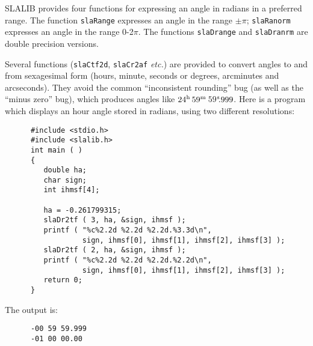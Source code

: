 \documentclass[11pt,fleqn,twoside]{article}
\renewcommand{\_}{{\tt\char'137}}     %
\newcommand{\tseci}[1]   {$#1$\mbox{$^{\rm s}$}}
\newcommand{\tsec}[2]    {\tseci{#1}$\hspace{-0.3em}.#2$}
\newcommand{\hms}[4]    {$#1^{\rm h}\,#2^{\rm m}\,$\tsec{#3}{#4}}
\begin{document}
SLALIB provides four functions for expressing an angle in radians
in a preferred range.  The function
{\tt slaRange}
expresses an angle
in the range $\pm\pi$;
{\tt slaRanorm}
expresses an angle in the range
0-2$\pi$.  The functions
{\tt slaDrange}
and
{\tt slaDranrm}
are double precision versions.

Several functions
({\tt slaCtf2d},
{\tt slaCr2af}
{\it etc.}) are provided to convert
angles to and from
sexagesimal form (hours, minute, seconds or degrees,
arcminutes and arcseconds).
They avoid the common
``inconsistent rounding''
bug (as well as the ``minus zero'' bug),
which produces angles like \hms{24}{59}{59}{999}.
Here is a program which displays an hour angle
stored in radians, using two different resolutions:
\goodbreak
\vspace{-3ex}
\begin{verbatim}
      #include <stdio.h>
      #include <slalib.h>
      int main ( )
      {
         double ha;
         char sign;
         int ihmsf[4];

         ha = -0.261799315;
         slaDr2tf ( 3, ha, &sign, ihmsf );
         printf ( "%c%2.2d %2.2d %2.2d.%3.3d\n",
                  sign, ihmsf[0], ihmsf[1], ihmsf[2], ihmsf[3] );
         slaDr2tf ( 2, ha, &sign, ihmsf );
         printf ( "%c%2.2d %2.2d %2.2d.%2.2d\n",
                  sign, ihmsf[0], ihmsf[1], ihmsf[2], ihmsf[3] );
         return 0;
      }
\end{verbatim}
\vspace{-3ex}
The output is:
\vspace{-3ex}
\begin{verbatim}
      -00 59 59.999
      -01 00 00.00
\end{verbatim}
\vspace{-3ex}
\goodbreak
\end{document}
